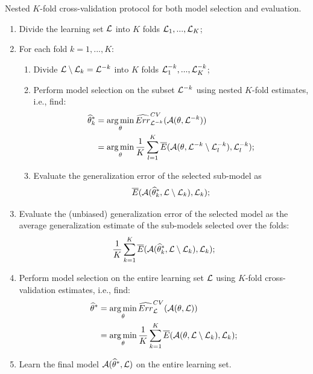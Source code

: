 \begin{algorithm}\label{algo:cv}
Nested $K$-fold cross-validation protocol for both model selection and evaluation.

\begin{enumerate}
\item Divide the learning set ${\cal L}$ into $K$ folds ${\cal L}_1, ..., {\cal L}_K$;
\item For each fold $k=1, ..., K$:
    \begin{enumerate}
        \item Divide ${\cal L}\setminus{\cal L}_k = {\cal L}^{-k}$ into $K$ folds ${\cal L}_1^{-k}, ..., {\cal L}_K^{-k}$;
        \item Perform model selection on the subset ${\cal L}^{-k}$ using nested $K$-fold estimates, i.e., find:
        \begin{align}
            \widehat{\theta}_k^* &= \operatorname*{arg\,min}_{\theta} \widehat{Err}_{{\cal L}^{-k}}^{CV}({\cal A}(\theta, {\cal L}^{-k}))\\
                                 &= \operatorname*{arg\,min}_{\theta} \frac{1}{K} \sum_{l=1}^K \overline{E}({\cal A}(\theta, {\cal L}^{-k} \setminus {\cal L}_l^{-k}), {\cal L}_l^{-k});
        \end{align}
        \item Evaluate the generalization error of the selected sub-model as
        \begin{equation}
            \overline{E}({\cal A}(\widehat{\theta}^*_k, {\cal L}\setminus{\cal L}_k), {\cal L}_k);
        \end{equation}
    \end{enumerate}
\item Evaluate the (unbiased) generalization error of the selected model as the average generalization estimate of the sub-models selected over the folds:
\begin{equation}
\frac{1}{K} \sum_{k=1}^K \overline{E}({\cal A}(\widehat{\theta}^*_k, {\cal L}\setminus{\cal L}_k), {\cal L}_k);
\end{equation}
\item Perform model selection on the entire learning set ${\cal L}$ using $K$-fold cross-validation estimates, i.e., find:
\begin{align}
    \widehat{\theta}^* &= \operatorname*{arg\,min}_{\theta} \widehat{Err}_{\cal L}^{CV}({\cal A}(\theta, {\cal L}))\\
                       &= \operatorname*{arg\,min}_{\theta} \frac{1}{K} \sum_{k=1}^K \overline{E}({\cal A}(\theta, {\cal L} \setminus {\cal L}_k), {\cal L}_k);
\end{align}
\item Learn the final model ${\cal A}(\widehat{\theta}^*, {\cal L})$ on the entire learning set.
\end{enumerate}
\end{algorithm}


